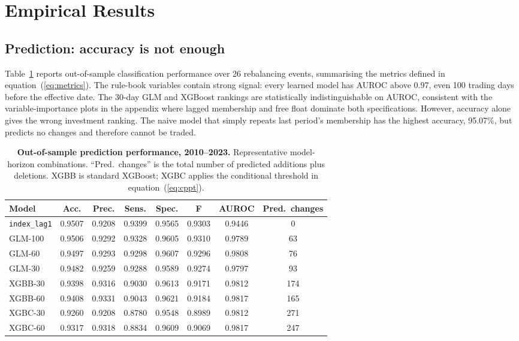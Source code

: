 \section{Empirical Results}
\label{sec:results}

\subsection{Prediction: accuracy is not enough}

Table~\ref{tab:acc} reports out-of-sample classification performance over 26 rebalancing events, summarising the metrics defined in equation~(\ref{eq:metrics}). The rule-book variables contain strong signal: every learned model has AUROC above 0.97, even 100 trading days before the effective date. The 30-day GLM and XGBoost rankings are statistically indistinguishable on AUROC, consistent with the variable-importance plots in the appendix where lagged membership and free float dominate both specifications. However, accuracy alone gives the wrong investment ranking. The naive model that simply repeats last period's membership has the highest accuracy, 95.07\%, but predicts no changes and therefore cannot be traded.

\begin{table}[H]
\centering
\small
\begin{tabular}{lccccccc}
\toprule
Model & Acc. & Prec. & Sens. & Spec. & F & AUROC & Pred.\ changes \\
\midrule
\texttt{index\_lag1} & 0.9507 & 0.9208 & 0.9399 & 0.9565 & 0.9303 & 0.9446 & 0 \\
\midrule
GLM-100  & 0.9506 & 0.9292 & 0.9328 & 0.9605 & 0.9310 & 0.9789 & 63  \\
GLM-60   & 0.9497 & 0.9293 & 0.9298 & 0.9607 & 0.9296 & 0.9808 & 76  \\
GLM-30   & 0.9482 & 0.9259 & 0.9288 & 0.9589 & 0.9274 & 0.9797 & 93  \\
XGBB-30  & 0.9398 & 0.9316 & 0.9030 & 0.9613 & 0.9171 & 0.9812 & 174 \\
XGBB-60  & 0.9408 & 0.9331 & 0.9043 & 0.9621 & 0.9184 & 0.9817 & 165 \\
XGBC-30  & 0.9260 & 0.9208 & 0.8780 & 0.9548 & 0.8989 & 0.9812 & 271 \\
XGBC-60  & 0.9317 & 0.9318 & 0.8834 & 0.9609 & 0.9069 & 0.9817 & 247 \\
\bottomrule
\end{tabular}
\caption{\textbf{Out-of-sample prediction performance, 2010--2023.} Representative model-horizon combinations. ``Pred.\ changes'' is the total number of predicted additions plus deletions. XGBB is standard XGBoost; XGBC applies the conditional threshold in equation~(\ref{eq:cppt}).}
\label{tab:acc}
\end{table}

